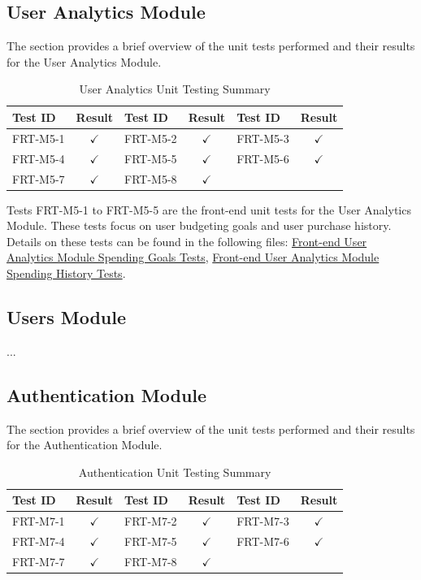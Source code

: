 \documentclass[12pt, titlepage]{article}
\begin{document}
\subsection{User Analytics Module}
The section provides a brief overview of the unit tests performed and their results for the
User Analytics Module.

\begin{longtable}{|l|c|l|c|l|c|}
  \caption{User Analytics Unit Testing Summary} \label{User Analytics Unit Test Summary} \\
  \toprule
  \textbf{Test ID} & \textbf{Result} & \textbf{Test ID} & \textbf{Result} & \textbf{Test ID} & \textbf{Result} \\
  \midrule
  FRT-M5-1 & $\checkmark$ & FRT-M5-2 & $\checkmark$ & FRT-M5-3 & $\checkmark$ \\
  \midrule
  FRT-M5-4 & $\checkmark$ & FRT-M5-5 & $\checkmark$ & FRT-M5-6 & $\checkmark$ \\
  \midrule
  FRT-M5-7 & $\checkmark$ & FRT-M5-8 & $\checkmark$  &  &\\
  \bottomrule
\end{longtable}

Tests FRT-M5-1 to FRT-M5-5 are the front-end unit tests for the User Analytics Module. These tests focus on user budgeting goals and user purchase history. Details on these tests can be found in the following files: \href{https://github.com/allanfang1/grocery_spending_tracker_app/blob/main/test/goals_provider_test.dart}{Front-end User Analytics Module Spending Goals Tests}, \href{https://github.com/allanfang1/grocery_spending_tracker_app/blob/main/test/history_provider_test.dart}{Front-end User Analytics Module Spending History Tests}.

\subsection{Users Module}

...

\subsection{Authentication Module}

The section provides a brief overview of the unit tests performed and their results for the
Authentication Module.

\begin{longtable}{|l|c|l|c|l|c|}
  \caption{Authentication Unit Testing Summary} \label{Authentication Unit Test Summary} \\
  \toprule
  \textbf{Test ID} & \textbf{Result} & \textbf{Test ID} & \textbf{Result} & \textbf{Test ID} & \textbf{Result} \\
  \midrule
  FRT-M7-1 & $\checkmark$ & FRT-M7-2 & $\checkmark$ & FRT-M7-3 & $\checkmark$ \\
  \midrule
  FRT-M7-4 & $\checkmark$ & FRT-M7-5 & $\checkmark$ & FRT-M7-6 & $\checkmark$ \\
  \midrule
  FRT-M7-7 & $\checkmark$ & FRT-M7-8 & $\checkmark$  &  &\\
  \bottomrule
\end{longtable}
\end{document}
